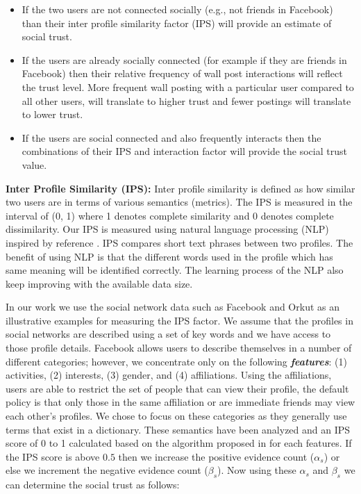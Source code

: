 \documentclass[conference]{IEEEtran}
\begin{document}
\begin{itemize}
\item If the two users are not connected socially (e.g., not friends in Facebook) than their inter profile similarity factor (IPS) will provide an estimate of social trust.
\item If the users are already socially connected (for example if they are friends in Facebook) then their relative frequency of wall post interactions will reflect the trust level. More frequent wall posting with a particular user compared to all other users, will translate to higher trust and fewer postings will translate to lower trust.
\item If the users are social connected and also frequently interacts then the combinations of their IPS and interaction factor will provide the social trust value.
\end{itemize}

{\bf Inter Profile Similarity (IPS):}
Inter profile similarity is defined as how similar two users are in terms of various semantics (metrics). The IPS is measured in the interval of (0, 1) where 1 denotes complete similarity and 0 denotes complete dissimilarity. Our IPS is measured using natural language processing (NLP) inspired by reference \cite{felix_ips}. IPS compares short text phrases between two profiles. The benefit of using NLP is that the different words used in the profile which has same meaning will be identified correctly. The learning process of the NLP also keep improving with the available data size.

In our work we use the social network data such as Facebook and Orkut as an illustrative examples for measuring the IPS factor. We assume that the profiles in social networks are described using a set of key words and we have access to those profile details. Facebook allows users to describe themselves in a number of different categories; however, we concentrate only on the following {\bf \it features}: (1) activities, (2) interests, (3) gender, and (4) affiliations. Using the affiliations, users are able to restrict the set of people that can view their profile, the default policy is that only those in the same affiliation or are immediate friends may view each other's profiles. We chose to focus on these categories as they generally use terms that exist in a dictionary.
These semantics have been analyzed and an IPS score of 0 to 1 calculated based on the algorithm proposed in \cite{felix_ips} for each features. If the IPS score is above $0.5$ then we increase the positive evidence count ($\alpha_s$) or else we increment the negative evidence count ($\beta_s$). Now using these $\alpha_s$ and $\beta_s$ we can determine the social trust as follows:
\end{document}
